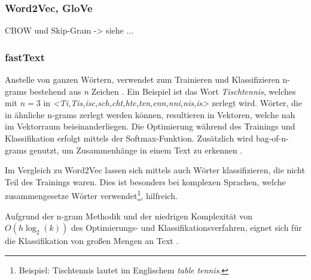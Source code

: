 


\subsubsection*{Word2Vec, GloVe}


CBOW und Skip-Gram -> siehe ...

\subsubsection*{fastText}

Anstelle von ganzen Wörtern, verwendet \ft zum Trainieren und Klassifizieren n-grams bestehend aus \textit{n} Zeichen \autocite{kowsari_text_2019, joulin_fasttextzip_2016}. Ein Beispiel ist das Wort \textit{Tischtennis}, welches mit \(n = 3\) in \textit{<Ti,Tis,isc,sch,cht,hte,ten,enn,nni,nis,is>} zerlegt wird. Wörter, die in ähnliche n-grams zerlegt werden können, resultieren in Vektoren, welche nah im Vektorraum beieinanderliegen. Die Optimierung während des Trainings und Klassifikation erfolgt mittels der Softmax-Funktion. Zusätzlich wird bag-of-n-grams genutzt, um Zusammenhänge in einem Text zu erkennen \autocite[2]{joulin_bag_2016}.

Im Vergleich zu Word2Vec lassen sich mittels \ft auch Wörter klassifizieren, die nicht Teil des Trainings waren. Dies ist besonders bei komplexen Sprachen, welche zusammengesetze Wörter verwendet\footnote{Beispiel: Tischtennis lautet im Englischem \textit{table tennis}.}, hilfreich.

Aufgrund der n-gram Methodik und der niedrigen Komplexität von \(O(h \log_{2}(k))\) des Optimierungs- und Klassifikationsverfahren, eignet sich \ft für die Klassifikation von großen Mengen an Text \autocite[2\psqq]{joulin_bag_2016}.

